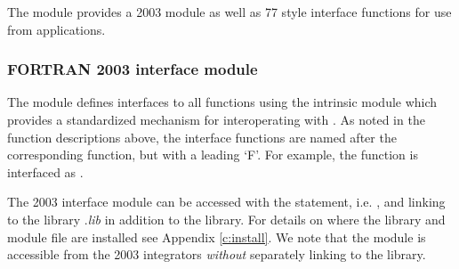 The {\sunlinsolpcg} module provides a {\F} 2003 module as well as {\F} 77
style interface functions for use from {\F} applications.

\subsubsection*{FORTRAN 2003 interface module}
The  {\F} module defines interfaces to all
{\sunlinsolpcg} {\CC} functions using the intrinsic 
module which provides a standardized mechanism for interoperating with {\CC}. As
noted in the {\CC} function descriptions above, the interface functions are
named after the corresponding {\CC} function, but with a leading `F'. For
example, the function  is interfaced as
.

The {\F} 2003 {\sunlinsolpcg} interface module can be accessed with the 
statement, i.e. , and linking to the library
.{\em lib} in addition to the {\CC} library.
For details on where the library and module file
 are installed see Appendix \ref{c:install}.
We note that the module is accessible from the {\F} 2003 {\sundials} integrators
\textit{without} separately linking to the
 library.

